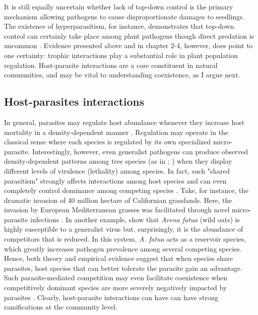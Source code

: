 \documentclass[b5paper,justified]{tufte-book} %
\begin{document}
\begin{fullwidth}
It is still equally uncertain whether lack of top-down control is the primary mechanism allowing pathogens to cause disproportionate damages to seedlings. The existence of hyperparasitism, for instance, demonstrates that top-down control can certainly take place among plant pathogens \citep{Pal2006} though direct predation is uncommon \citep{Agrios2005}. Evidence presented above and in chapter 2-4, however, does point to one certainty: trophic interactions play a substantial role in plant population regulation. Host-parasite interactions are a core constituent in natural communities, and may be vital to understanding coexistence, as I argue next. 

\subsection{Host-parasites interactions}
In general, parasites may regulate host abundance whenever they increase host mortality in a density-dependent manner \citep[e.g.][]{Roberts1995}. Regulation may operate in the classical sense \citep[\textit{sensu}][]{Janzen1970} where each species is regulated by its own specialized micro-parasite. Interestingly, however, even generalist pathogens can produce observed density-dependent patterns among tree species (as in \citealt{Comita2010}; \citealt{Mangan2010}) when they display different levels of virulence (lethality) among species. In fact, such "shared parasitism" strongly affects interactions among host species and can even completely control dominance among competing species \citep{Holt1985, Holt2007}. Take, for instance, the dramatic invasion of 40 million hectare of Californian grasslands. Here, the invasion by European Mediterranean grasses was facilitated through novel micro-parasite infections \citep{Borer2007}. In another example, \citet{Power2004} show that \textit{Avena fatua} (wild oats) is highly susceptible to a generalist virus but, surprisingly, it is the abundance of competitors that is reduced. In this system, \textit{A. fatua} acts as a reservoir species, which greatly increases pathogen prevalence among several competing species. Hence, both theory and empirical evidence suggest that when species share parasites, host species that can better tolerate the parasite gain an advantage. Such parasite-mediated competition may even facilitate coexistence when competitively dominant species are more severely negatively impacted by parasites \citep{Packer2000}. Clearly, host-parasite interactions can have can have strong ramifications at the community level.


\end{fullwidth}
\end{document}
